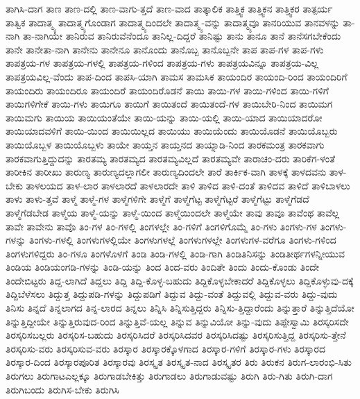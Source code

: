 {ತಾಗಿಸಿ-ದಾಗ
ತಾಣ
ತಾಣ-ದಲ್ಲಿ
ತಾಣ-ವಾಗು-ತ್ತದೆ
ತಾಣ-ವಾದ
ತಾತ್ಕಾಲಿಕ
ತಾತ್ತ್ವಿಕ
ತಾತ್ತ್ವಿಕನ
ತಾತ್ತ್ವಿಕರ
ತಾತ್ಪರ್ಯ
ತಾತ್ವಿಕ
ತಾದಾತ್ಮ್ಯ
ತಾದಾತ್ಮ್ಯಗೊಂಡಾಗ
ತಾದಾತ್ಮ್ಯದಿಂದಲೇ
ತಾದಾತ್ಮ್ಯ-ವನ್ನು
ತಾದಾತ್ಮ್ಯವೂ
ತಾನರಿಯುವ
ತಾನವಳನ್ನು
ತಾ-ನಾಗಿ
ತಾ-ನಾಗಿಯೇ
ತಾನಿರುವ
ತಾನಿರುವೆನೆಂದೂ
ತಾನಿಲ್ಲ-ದಿದ್ದರೆ
ತಾನಿಷ್ಟು
ತಾನು
ತಾನೂ
ತಾನೆ
ತಾನೆಸಗಬೇಕೆಂದು
ತಾನೇ
ತಾನೇತಾ-ನಾಗಿ
ತಾನೇನು
ತಾನೇನೂ
ತಾನೊಂದು
ತಾನೊಬ್ಬ
ತಾನೊಬ್ಬನೇ
ತಾಪ
ತಾಪ-ಗಳ
ತಾಪ-ಗಳು
ತಾಪತ್ರಯ-ಗಳ
ತಾಪತ್ರಯ-ಗಳಲ್ಲಿ
ತಾಪತ್ರಯ-ಗಳಿಂದ
ತಾಪತ್ರಯ-ಗಳು
ತಾಪತ್ರಯವಿನ್ನೂ
ತಾಪತ್ರಯ-ವಿಲ್ಲ
ತಾಪತ್ರಯವಿಲ್ಲ-ವೆಂದು
ತಾಪ-ದಿಂದ
ತಾಪಸಿ-ಯಾಗಿ
ತಾಮಸ
ತಾಮಸಿಕ
ತಾಯಂದಿರ
ತಾಯಂದಿ-ರಿಂದ
ತಾಯಂದಿರಿಗೆ
ತಾಯಂದಿರು
ತಾಯಂದಿರೂ
ತಾಯಂದಿರೆ
ತಾಯಂದಿರೊಡನೆ
ತಾಯಿ
ತಾಯಿ-ಗಳ
ತಾಯಿ-ಗಳಿಂದ
ತಾಯಿ-ಗಳಿಗೆ
ತಾಯಿಗಳಿಗೇಕೆ
ತಾಯಿ-ಗಳು
ತಾಯಿಗೂ
ತಾಯಿಗೆ
ತಾಯಿತಂದೆ
ತಾಯಿತಂದೆ-ಗಳ
ತಾಯಿಬೇರಿ-ನಿಂದ
ತಾಯಿಮಗ
ತಾಯಿಮಗು
ತಾಯಿಯ
ತಾಯಿಯಂತೆಯೇ
ತಾಯಿ-ಯನ್ನು
ತಾಯಿ-ಯಲ್ಲಿ
ತಾಯಿ-ಯಾದ
ತಾಯಿಯಾದರೋ
ತಾಯಿಯಾದವಳಿಗೆ
ತಾಯಿ-ಯಿಂದ
ತಾಯಿಯಿಲ್ಲದ
ತಾಯಿಯು
ತಾಯಿಯೆಂದು
ತಾಯಿಯೊಡನೆ
ತಾಯಿಯೊಬ್ಬರು
ತಾಯಿಯೊಬ್ಬಳ
ತಾಯಿಯೊಬ್ಬಳು
ತಾಯೇ
ತಾಯ್ತನ
ತಾಯ್ತನದ
ತಾಯ್ನಾಡಿ-ನಿಂದ
ತಾರಕಮಂತ್ರ
ತಾರಕವಾಗು
ತಾರಕವಾಗುತ್ತಿದ್ದುದನ್ನು
ತಾರತಮ್ಯ
ತಾರತಮ್ಯದ
ತಾರತಮ್ಯವಿಲ್ಲದೆ
ತಾರತಮ್ಯವೇ
ತಾರಾಚಂ-ದರು
ತಾರಿಕೆಗ-ಳಂತೆ
ತಾರೀಕಿನ
ತಾರೀಖು
ತಾರುಣ್ಯ
ತಾರುಣ್ಯದಲ್ಲಾಗಲೀ
ತಾರುಣ್ಯದಿಂದಲೇ
ತಾರೆ
ತಾರ್ಕಿಕ-ವಾಗಿ
ತಾಳಕ್ಕೆ
ತಾಳದವನು
ತಾಳ-ಬೇಕು
ತಾಳಲಯದ
ತಾಳ-ಲಾರ
ತಾಳಲಾರದೆ
ತಾಳಲಾರದೇ
ತಾಳಿ
ತಾಳಿದ
ತಾಳಿ-ದಂತೆ
ತಾಳಿದವ
ತಾಳಿದೆ
ತಾಳಿಬಾಳಲು
ತಾಳು
ತಾಳು-ತ್ತವೆ
ತಾಳ್ಮೆ
ತಾಳ್ಮೆ-ಗಳ
ತಾಳ್ಮೆಗಳಿಗೇ
ತಾಳ್ಮೆಗೆ
ತಾಳ್ಮೆಗೆಟ್ಟ
ತಾಳ್ಮೆಗೆಟ್ಟರೆ
ತಾಳ್ಮೆಗೆಟ್ಟು
ತಾಳ್ಮೆಗೆಡದೆ
ತಾಳ್ಮೆಗೆಡಬೇಡ
ತಾಳ್ಮೆಯ
ತಾಳ್ಮೆ-ಯನ್ನು
ತಾಳ್ಮೆ-ಯಿಂದ
ತಾಳ್ಮೆಯಿಂದಲೇ
ತಾಳ್ಮೆಯೇ
ತಾವು
ತಾವೂ
ತಾವೆಂಥ
ತಾವೆಲ್ಲ
ತಾವೇ
ತಾವೇನು
ತಾವೊ
ತಿಂ-ಗಳ
ತಿಂ-ಗಳಲ್ಲಿ
ತಿಂಗಳಲ್ಲೇ
ತಿಂ-ಗಳಿಗೆ
ತಿಂಗಳಿಗೊಮ್ಮೆ
ತಿಂ-ಗಳು
ತಿಂಗಳು-ಗಳ
ತಿಂಗಳು-ಗಳನ್ನು
ತಿಂಗಳು-ಗಳಲ್ಲಿ
ತಿಂಗಳುಗಳಲ್ಲಿಯೇ
ತಿಂಗಳುಗಳಲ್ಲೆ
ತಿಂಗಳುಗಳಲ್ಲೇ
ತಿಂಗಳುಗಳ-ವರೆಗೂ
ತಿಂಗಳು-ಗಳಿಂದ
ತಿಂಗಳುಗಳಿದ್ದರು
ತಿಂ-ಗಳೂ
ತಿಂಗಳೊಳಗೆ
ತಿಂಡಿ
ತಿಂಡಿ-ಗಳಲ್ಲಿ
ತಿಂಡಿ-ಗಾಗಿ
ತಿಂಡಿತಿನಿಸನ್ನು
ತಿಂಡಿತೀರ್ಥಗಳನ್ನೀಯುವ
ತಿಂಡಿಯ
ತಿಂಡಿಯಂಗಡಿ-ಗಳನ್ನು
ತಿಂಡಿ-ಯನ್ನು
ತಿಂದ
ತಿಂದ-ವರು
ತಿಂದಿತೇ
ತಿಂದು
ತಿಂದು-ಕೊಂಡು
ತಿಂದೇ
ತಿಂದೇಬಿಟ್ಟರು
ತಿದ್ದ-ಲಾಗಿದೆ
ತಿದ್ದಲು
ತಿದ್ದಿ
ತಿದ್ದಿ-ಕೊಳ್ಳ-ಬಹುದು
ತಿದ್ದಿಕೊಳ್ಳಬೇಕಾದರೆ
ತಿದ್ದಿಕೊಳ್ಳಲು
ತಿದ್ದಿಕೊಳ್ಳುವು-ದಕ್ಕೆ
ತಿದ್ದಿಬೆಳೆಸಲು
ತಿದ್ದುತ್ತ
ತಿದ್ದುಪಡಿ-ಗಳನ್ನು
ತಿದ್ದುಪಡಿಗೆ
ತಿದ್ದುವ
ತಿದ್ದು-ವಂತೆ
ತಿದ್ದುವಲ್ಲಿ
ತಿದ್ದುವ-ವರು
ತಿದ್ದು-ವುದು
ತಿನಿಸು
ತಿನ್ನದೆ
ತಿನ್ನಲಾಗದ
ತಿನ್ನ-ಲಾರದ
ತಿನ್ನಲು
ತಿನ್ನಿಸಿ
ತಿನ್ನಿಸುತ್ತಿದ್ದರು
ತಿನ್ನಿಸು-ತ್ತಿದ್ದಾರೆಂದು
ತಿನ್ನುತ್ತಾರೆ
ತಿನ್ನುತ್ತಿದೆಯೋ
ತಿನ್ನುತ್ತಿದ್ದೀಯೇ
ತಿನ್ನುತ್ತಿರುವುದ-ರಿಂದ
ತಿನ್ನುತ್ತಿವೆ-ಯಲ್ಲ
ತಿನ್ನುವ
ತಿನ್ನುವಿಯೋ
ತಿನ್ನು-ವುದು
ತಿಪ್ಪೇಸ್ವಾಮಿ
ತಿರಸ್ಕರಿಸದೇ
ತಿರಸ್ಕರಿಸಬಲ್ಲರು
ತಿರಸ್ಕರಿಸ-ಬಹುದು
ತಿರಸ್ಕರಿಸಿದರೆ
ತಿರಸ್ಕರಿಸಿದವರ
ತಿರಸ್ಕರಿಸಿದಷ್ಟು
ತಿರಸ್ಕರಿಸುತ್ತಿದ್ದ
ತಿರಸ್ಕರಿಸು-ತ್ತೇನೆ
ತಿರಸ್ಕರಿಸು-ವರು
ತಿರಸ್ಕರಿಸುವ-ವರು
ತಿರಸ್ಕಾರ
ತಿರಸ್ಕಾರಕ್ಕೊಳಗಾದ
ತಿರಸ್ಕಾರ-ಗಳಿಗೆ
ತಿರಸ್ಕಾರ-ಗಳು
ತಿರಸ್ಕಾರದ
ತಿರಸ್ಕಾರ-ದಿಂದ
ತಿರಸ್ಕಾರಪೂರಿತ
ತಿರಸ್ಕಾರವು
ತಿರಸ್ಕೃತ
ತಿರಸ್ಕೃತ-ನಾದ
ತಿರಸ್ಕೃತರ
ತಿರು
ತಿರುಕನ
ತಿರುಗ-ಲಾರಂಭಿ-ಸಿತು
ತಿರುಗಲು
ತಿರುಗಾಟಎಲ್ಲಕ್ಕೂ
ತಿರುಗಾಡಬೇಕಿತ್ತು
ತಿರುಗಾಡಲು
ತಿರುಗಾಡುವಷ್ಟು
ತಿರುಗಿ
ತಿರು-ಗಿತು
ತಿರುಗಿ-ದಾಗ
ತಿರುಗಿಬಂದು
ತಿರುಗಿಸ-ಬೇಕು
ತಿರುಗಿಸಿ
}
